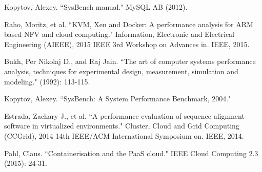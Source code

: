 \documentclass[11pt]{article}
\begin{document}
\begin{thebibliography}{99}
		Kopytov, Alexey. ``SysBench manual." MySQL AB (2012).
		
		Raho, Moritz, et al. ``KVM, Xen and Docker: A performance analysis for ARM based NFV and cloud computing." Information, Electronic and Electrical Engineering (AIEEE), 2015 IEEE 3rd Workshop on Advances in. IEEE, 2015.
		
		Bukh, Per Nikolaj D., and Raj Jain. ``The art of computer systems performance analysis, techniques for experimental design, measurement, simulation and modeling." (1992): 113-115.
		
		Kopytov, Alexey. ``SysBench: A System Performance Benchmark, 2004."
		
		Estrada, Zachary J., et al. ``A performance evaluation of sequence alignment software in virtualized environments." Cluster, Cloud and Grid Computing (CCGrid), 2014 14th IEEE/ACM International Symposium on. IEEE, 2014.
		
		Pahl, Claus. ``Containerisation and the PaaS cloud." IEEE Cloud Computing 2.3 (2015): 24-31.
		
	\end{thebibliography}
	
\end{document}
